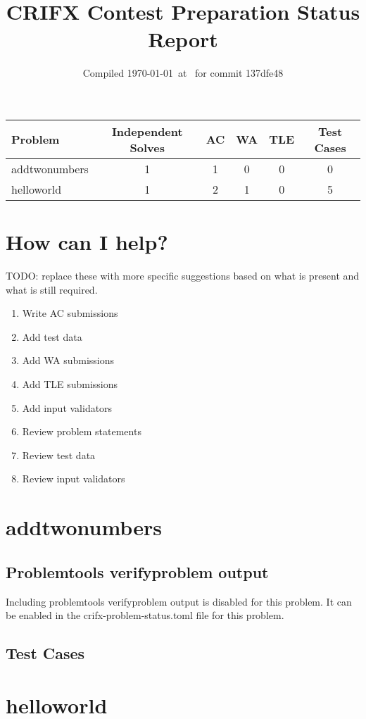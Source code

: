 \documentclass{article}%
\title{CRIFX Contest Preparation Status Report}%
\date{Compiled \today~at \DTMcurrenttime\DTMcurrentzone~for commit 137dfe48}%
\begin{document}
%
\normalsize%
\maketitle%
\begin{tabular}{|l|c|c|c|c|c|}%
\hline%
\rowcolor{cyan}%
Problem&Independent Solves&AC&WA&TLE&Test Cases\\%
\hline%
addtwonumbers&1&1&0&0&0\\%
\hline%
helloworld&1&2&1&0&5\\%
\hline%
\end{tabular}%
\section{How can I help?}%
\label{sec:HowcanIhelp?}%
TODO: replace these with more specific suggestions based on what is present and what is still required.%
\begin{enumerate}%
\item%
Write AC submissions%
\item%
Add test data%
\item%
Add WA submissions%
\item%
Add TLE submissions%
\item%
Add input validators%
\item%
Review problem statements%
\item%
Review test data%
\item%
Review input validators%
\end{enumerate}

%
\newpage%
\section{addtwonumbers}%
\label{sec:addtwonumbers}%
\subsection{Problemtools verifyproblem output}%
\label{subsec:Problemtoolsverifyproblemoutput}%
Including problemtools verifyproblem output is disabled for this problem. It can be enabled in the crifx{-}problem{-}status.toml file for this problem.

%
\subsection{Test Cases}%
\label{subsec:TestCases}%

%
\newpage%
\section{helloworld}%
\label{sec:helloworld}%
\end{document}
